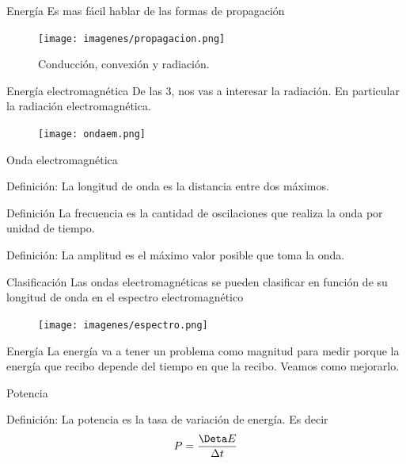 \documentclass[]{beamer}
\begin{document}
\begin{frame}{Energía}
  Es mas fácil hablar de las formas de propagación
  \begin{figure}
    \texttt{[image: imagenes/propagacion.png]}
    \caption{Conducción, convexión y radiación.}
  \end{figure}
\end{frame}

\begin{frame}{Energía electromagnética}
  De las 3, nos vas a interesar la radiación. En particular la radiación electromagnética.
  \begin{figure}
    \texttt{[image: ondaem.png]}
  \end{figure}
\end{frame}

\begin{frame}{Onda electromagnética}
  \begin{block}{Definición:}
    La longitud de onda es la distancia entre dos máximos.
  \end{block}
  \begin{block}{Definición}
    La frecuencia es la cantidad de oscilaciones que realiza la onda por unidad de tiempo.
  \end{block}
  \begin{block}{Definición:}
    La amplitud es el máximo valor posible que toma la onda.
  \end{block}
\end{frame}

\begin{frame}{Clasificación}
  Las ondas electromagnéticas se pueden clasificar en función de su longitud de onda en el espectro electromagnético
  \begin{figure}
    \texttt{[image: imagenes/espectro.png]}
  \end{figure}
\end{frame}

\begin{frame}{Energía}
  La energía va a tener un problema como magnitud para medir porque la energía que recibo depende del tiempo en que la recibo. Veamos como mejorarlo.
\end{frame}

\begin{frame}{Potencia}
  \begin{block}{Definición:}
    La potencia es la tasa de variación de energía. Es decir
    \begin{equation}
      P = \frac{\Deta E}{\Delta t}
    \end{equation}
  \end{block}
\end{frame}
\end{document}
